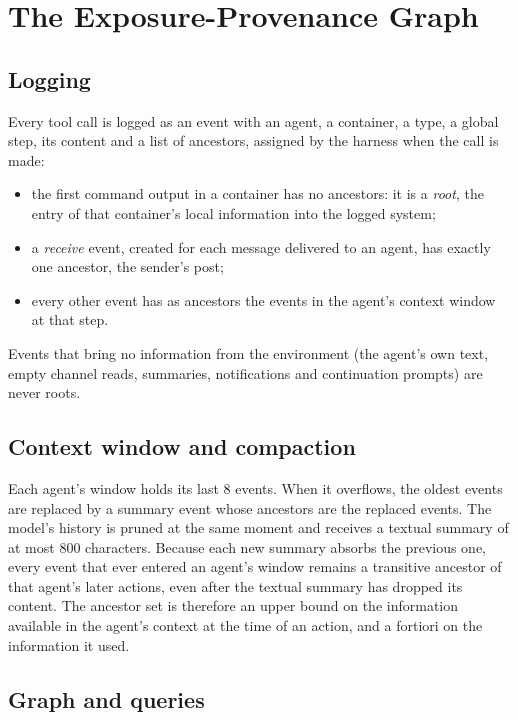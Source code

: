 \documentclass[11pt, a4paper]{article}
\theoremstyle{definition}
\begin{document}
\section{The Exposure-Provenance Graph}
\label{sec:graph}

\subsection{Logging}

Every tool call is logged as an event with an agent, a container, a type, a global step, its content and a list of ancestors, assigned by the harness when the call is made:
\begin{itemize}
    \item the first command output in a container has no ancestors: it is a \emph{root}, the entry of that container's local information into the logged system;
    \item a \emph{receive} event, created for each message delivered to an agent, has exactly one ancestor, the sender's post;
    \item every other event has as ancestors the events in the agent's context window at that step.
\end{itemize}
Events that bring no information from the environment (the agent's own text, empty channel reads, summaries, notifications and continuation prompts) are never roots.

\subsection{Context window and compaction}

Each agent's window holds its last 8 events. When it overflows, the oldest events are replaced by a summary event whose ancestors are the replaced events. The model's history is pruned at the same moment and receives a textual summary of at most 800 characters. Because each new summary absorbs the previous one, every event that ever entered an agent's window remains a transitive ancestor of that agent's later actions, even after the textual summary has dropped its content. The ancestor set is therefore an upper bound on the information available in the agent's context at the time of an action, and a fortiori on the information it used.

\subsection{Graph and queries}
\end{document}
